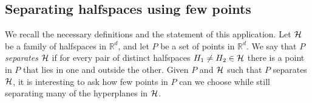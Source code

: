 \documentclass[11pt]{article}
\newcommand{\R}{{\mathbb R}}
\newcommand{\HH}{{\cal H}}
\begin{document}
\subsection{Separating halfspaces using few points}
We recall the necessary definitions and the statement of this application.
Let $\HH$ be a family of halfspaces in $\R^d$, and let $P$ be a set of points in $\R^d$. We say that $P$ \emph{separates} $\HH$ if for every pair of distinct halfspaces $H_1 \neq H_2 \in \HH$ there is a point in $P$ that lies in one and outside the other. 
Given $P$ and $\HH$ such that $P$ separates $\HH$, it is interesting to ask how few points in $P$ can we choose while still separating many of the hyperplanes in $\HH$.
\end{document}
